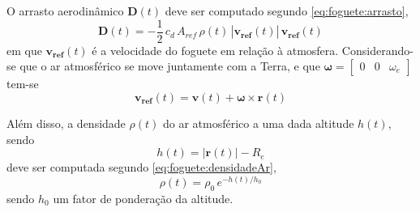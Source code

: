 O arrasto aerodinâmico $ \mathbf{D}(t) $ deve ser computado segundo \eqref{eq:foguete:arrasto}, 
%
\begin{equation}
	\label{eq:foguete:arrasto}
	\mathbf{D}(t) = -\frac{1}{2} \, c_d \, A_{ref} \, \rho(t) \, |\mathbf{v_{ref}}(t)| \, \mathbf{v_{ref}}(t)
\end{equation}
%
em que $ \mathbf{v_{ref}}(t) $ é a velocidade do foguete em relação à atmosfera. Considerando-se que o ar atmosférico se move juntamente com a Terra, e que $ {\bm \omega} = \begin{bmatrix} 0 & 0 & \omega_e \end{bmatrix} $ tem-se
%
\begin{equation}
	\mathbf{v_{ref}}(t) = \mathbf{v}(t) + {\bm \omega} \times \mathbf{r}(t)
\end{equation}

Além disso, a densidade $ \rho(t) $ do ar atmosférico a uma dada altitude $ h(t) $, sendo
%
\begin{equation}
	\label{eq:foguete:altitude}
	h(t) = |\mathbf{r}(t)| - R_e
\end{equation}
%
deve ser computada segundo \eqref{eq:foguete:densidadeAr},
%
\begin{equation}
	\label{eq:foguete:densidadeAr}
	\rho(t) = \rho_0 \, e^{-h(t)/h_0}
\end{equation} 
%
sendo $ h_0 $ um fator de ponderação da altitude. 

